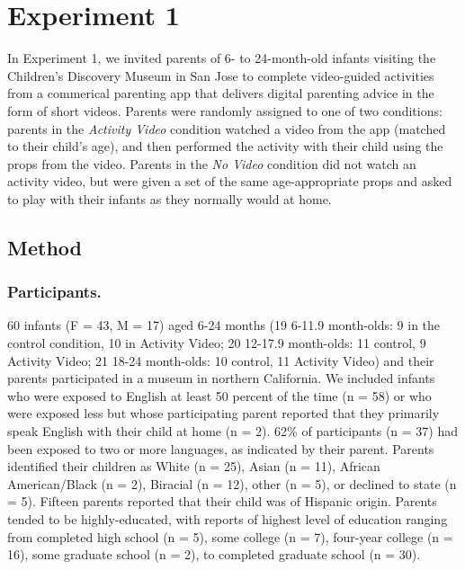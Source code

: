 \documentclass[man,floatsintext]{apa6}
\begin{document}
\hypertarget{experiment-1}{%
\section{Experiment 1}\label{experiment-1}}

In Experiment 1, we invited parents of 6- to 24-month-old infants visiting the Children's Discovery Museum in San Jose to complete video-guided activities from a commerical parenting app that delivers digital parenting advice in the form of short videos.
Parents were randomly assigned to one of two conditions: parents in the \emph{Activity Video} condition watched a video from the app (matched to their child's age), and then performed the activity with their child using the props from the video.
Parents in the \emph{No Video} condition did not watch an activity video, but were given a set of the same age-appropriate props and asked to play with their infants as they normally would at home.

\hypertarget{method}{%
\subsection{Method}\label{method}}

\hypertarget{participants.}{%
\subsubsection{Participants.}\label{participants.}}

60 infants (F = 43, M = 17) aged 6-24 months (19 6-11.9 month-olds: 9 in the control condition, 10 in Activity Video; 20 12-17.9 month-olds: 11 control, 9 Activity Video; 21 18-24 month-olds: 10 control, 11 Activity Video) and their parents participated in a museum in northern California.
We included infants who were exposed to English at least 50 percent of the time (n = 58) or who were exposed less but whose participating parent reported that they primarily speak English with their child at home (n = 2).
62\% of participants (n = 37) had been exposed to two or more languages, as indicated by their parent.
Parents identified their children as White (n = 25), Asian (n = 11), African American/Black (n = 2), Biracial (n = 12), other (n = 5), or declined to state (n = 5).
Fifteen parents reported that their child was of Hispanic origin.
Parents tended to be highly-educated, with reports of highest level of education ranging from completed high school (n = 5), some college (n = 7), four-year college (n = 16), some graduate school (n = 2), to completed graduate school (n = 30).
\end{document}
